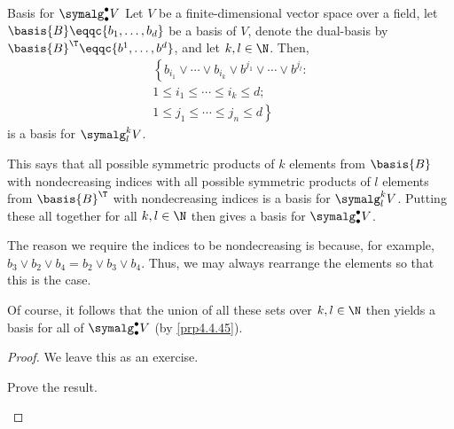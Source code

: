 \begin{prp}{Basis for $\symalg _{\bullet}^{\bullet}V$}{}
	Let $V$ be a finite-dimensional vector space over a field, let $\basis{B}\eqqc \{ b_1,\ldots ,b_d\}$ be a basis of $V$, denote the dual-basis by $\basis{B}^{\T}\eqqc \{ b^1,\ldots ,b^d\}$, and let $k,l\in \N$.  Then,
	\begin{equation}
		\begin{multlined}
			\left\{ b_{i_1}\vee \cdots \vee b_{i_k}\vee b^{j_1}\vee \cdots \vee b^{j_l}:\right. \\ \left. 1\leq i_1\leq \cdots \leq i_k\leq d; \right. \\ \left. 1\leq j_1\leq \cdots \leq j_n\leq d\right\}
		\end{multlined}
	\end{equation}
	is a basis for $\symalg _l^kV$.
	\begin{rmk}
		This says that all possible symmetric products of $k$ elements from $\basis{B}$ with nondecreasing indices with all possible symmetric products of $l$ elements from $\basis{B}^{\T}$ with nondecreasing indices is a basis for $\symalg _l^kV$.  Putting these all together for all $k,l\in \N$ then gives a basis for $\symalg _{\bullet}^{\bullet}V$.
		
		The reason we require the indices to be nondecreasing is because, for example, $b_3\vee b_2\vee b_4=b_2\vee b_3\vee b_4$.  Thus, we may always rearrange the elements so that this is the case.
	\end{rmk}
	\begin{rmk}
		Of course, it follows that the union of all these sets over $k,l\in \N$ then yields a basis for all of $\symalg _{\bullet}^{\bullet}V$ (by \cref{prp4.4.45}).
	\end{rmk}
	\begin{proof}
		We leave this as an exercise.
		\begin{exr}[breakable=false]{}{}
			Prove the result.
		\end{exr}
	\end{proof}
\end{prp}
